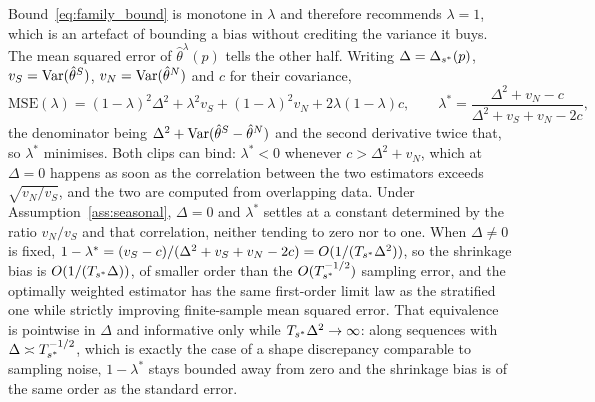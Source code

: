 \begin{remark}
\label{rem:optimal_lambda}
Bound~\eqref{eq:family_bound} is monotone in $\lambda$ and therefore
recommends $\lambda = 1$, which is an artefact of bounding a bias
without crediting the variance it buys.  The mean squared error of
$\hat{\theta}^{\lambda}(p)$ tells the other half.  Writing
$\Delta = \Delta_{s^*}(p)$, $v_S = \operatorname{Var}(\hat{\theta}^{S})$,
$v_N = \operatorname{Var}(\hat{\theta}^{N})$ and $c$ for their covariance,
\[
  \mathrm{MSE}(\lambda)
  = (1-\lambda)^2\Delta^2 + \lambda^2 v_S + (1-\lambda)^2 v_N
    + 2\lambda(1-\lambda)c ,
  \qquad
  \lambda^{*} = \frac{\Delta^2 + v_N - c}
                     {\Delta^2 + v_S + v_N - 2c},
\]
the denominator being $\Delta^2 + \operatorname{Var}(\hat{\theta}^{S} -
\hat{\theta}^{N})$ and the second derivative twice that, so
$\lambda^{*}$ minimises.  Both clips can bind: $\lambda^{*} < 0$ whenever
$c > \Delta^2 + v_N$, which at $\Delta = 0$ happens as soon as the
correlation between the two estimators exceeds $\sqrt{v_N/v_S}$, and the
two are computed from overlapping data.  Under
Assumption~\ref{ass:seasonal}, $\Delta = 0$ and $\lambda^{*}$ settles at a
constant determined by the ratio $v_N/v_S$ and that correlation, neither
tending to zero nor to one.  When $\Delta \neq 0$ is fixed,
$1 - \lambda^{*} = (v_S - c)/(\Delta^2 + v_S + v_N - 2c) =
O(1/(T_{s^*}\Delta^2))$, so the shrinkage bias is $O(1/(T_{s^*}\Delta))$, of
smaller order than the $O(T_{s^*}^{-1/2})$ sampling error, and the
optimally weighted estimator has the same first-order limit law as the
stratified one while strictly improving finite-sample mean squared error.
That equivalence is pointwise in $\Delta$ and informative only while
$T_{s^*}\Delta^2 \to \infty$: along sequences with
$\Delta \asymp T_{s^*}^{-1/2}$, which is exactly the case of a shape
discrepancy comparable to sampling noise, $1 - \lambda^{*}$ stays bounded
away from zero and the shrinkage bias is of the same order as the standard
error.
\end{remark}

